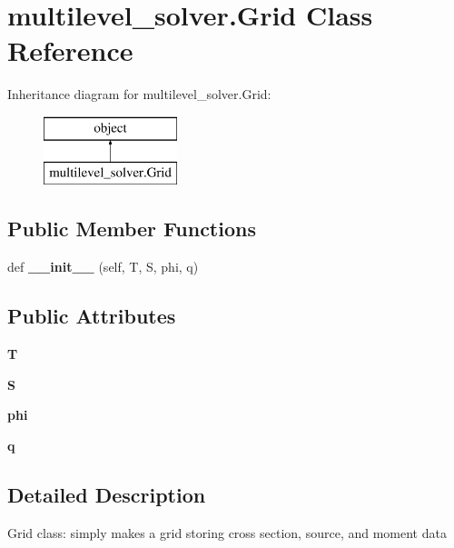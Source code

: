 \section{multilevel\+\_\+solver.\+Grid Class Reference}
\label{classmultilevel__solver_1_1_grid}
Inheritance diagram for multilevel\+\_\+solver.\+Grid\+:\begin{figure}[H]
\begin{center}
\leavevmode
\includegraphics[height=2.000000cm]{classmultilevel__solver_1_1_grid}
\end{center}
\end{figure}
\subsection*{Public Member Functions}
\begin{DoxyCompactItemize}
\item 
def {\bf \+\_\+\+\_\+init\+\_\+\+\_\+} (self, T, S, phi, q)
\end{DoxyCompactItemize}
\subsection*{Public Attributes}
\begin{DoxyCompactItemize}
\item 
{\bfseries T}\label{classmultilevel__solver_1_1_grid_a0b7bf6fa097bf746b5184ab01cdcde5e}

\item 
{\bfseries S}\label{classmultilevel__solver_1_1_grid_a09afc3b3bff07c40e9be152c58ad76cf}

\item 
{\bfseries phi}\label{classmultilevel__solver_1_1_grid_a8af9e729a98a54799ec600de52bcfe6c}

\item 
{\bfseries q}\label{classmultilevel__solver_1_1_grid_a703241b145c02c58b2e8edb36ab3d2e6}

\end{DoxyCompactItemize}


\subsection{Detailed Description}
\begin{DoxyVerb}Grid class: simply makes a grid storing cross section, source, and moment data\end{DoxyVerb}
 

